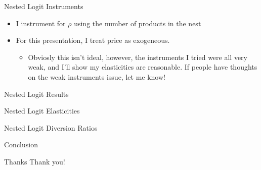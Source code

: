 \documentclass[10pt, xcolor=dvipsnames]{beamer}
\begin{document}
\begin{frame}{Nested Logit Instruments}
    \begin{itemize}
        \item I instrument for $\rho$ using the number of products in the nest
        \item For this presentation, I treat price as exogeneous.
        \begin{itemize}
            \item Obviosly this isn't ideal, however, the instruments I tried were all very weak, and I'll show my elasticities are reasonable. If people have thoughts on the weak instruments issue, let me know!
        \end{itemize}
    \end{itemize}
    
\end{frame}

\begin{frame}{Nested Logit Results}
    \small
    
\end{frame}

\begin{frame}{Nested Logit Elasticities}
    
\end{frame}

\begin{frame}{Nested Logit Diversion Ratios}
    
\end{frame}

\begin{frame}{Conclusion}
    
\end{frame}

\begin{frame}{Thanks}
    Thank you!
\end{frame}

    

    

    

    
    
\end{document}
